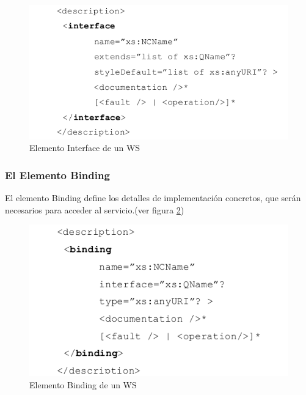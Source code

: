 \begin{figure}[!h] 
	\begin{center}
		\includegraphics [scale=0.70]{imagenes/elemento_interface.png}
	\end{center}
	\caption{Elemento Interface de un WS}
	\label{fig:Elemento Interface de un WS}
\end{figure} 

\subsubsection*{El Elemento Binding}

El elemento Binding define los detalles de implementación concretos, que serán necesarios para acceder al servicio.(ver figura \ref{fig:Elemento Binding de un WS})

\begin{figure}[!h] 
\begin{center}
	\includegraphics [scale=0.70]{imagenes/elemento_binding.png}
\end{center}
\caption{Elemento Binding de un WS}
\label{fig:Elemento Binding de un WS}
\end{figure} 

